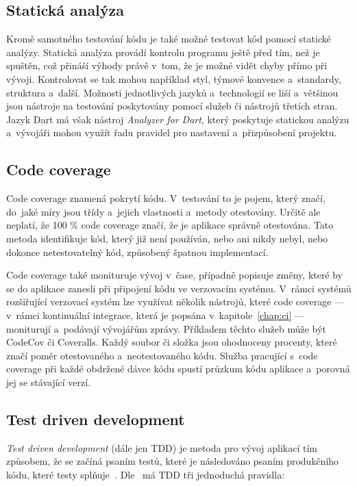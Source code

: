 \pagebreak
\subsection{Statická analýza}

Kromě samotného testování kódu je také možné testovat kód pomocí statické
analýzy.
Statická analýza provádí kontrolu programu ještě před tím,
než je spuštěn,
což přináší výhody právě v~tom,
že je možné vidět chyby přímo při vývoji.
Kontrolovat se tak mohou například styl, týmové konvence a~standardy, struktura
a~další.
Možnosti jednotlivých jazyků a~technologií se liší a~většinou jsou nástroje
na testování poskytovány pomocí služeb či nástrojů třetích stran.
Jazyk Dart má však nástroj \emph{Analyzer for Dart},
který poskytuje statickou analýzu
a~vývojáři mohou využít řadu pravidel pro nastavení
a~přizpůsobení projektu.~\cite{analyzer}

\subsection{Code coverage}

Code coverage znamená pokrytí kódu.
V~testování to je pojem,
který značí,
do~jaké míry jsou třídy a~jejich vlastnosti a~metody otestovány.
Určitě ale neplatí,
že 100 \% code coverage značí,
že je aplikace správně otestována.
Tato metoda identifikuje kód,
který již není používán,
nebo ani nikdy nebyl,
nebo dokonce netestovatelný kód,
způsobený špatnou implementací.~\cite{code_coverage}

Code coverage také monituruje vývoj v~čase,
případně popisuje změny,
které by se do aplikace zanesli při připojení kódu ve verzovacím systému.
V~rámci systémů rozšiřující verzovací systém lze využívat několik nástrojů,
které code coverage
--- v~rámci kontinuální integrace, která je popsána v~kapitole~\ref{chap:ci} ---
moniturují a~podávají vývojářům zprávy.
Příkladem těchto služeb může být CodeCov či Coveralls.
Každý soubor či složka jsou ohodnoceny procenty,
které značí poměr otestovaného a~neotestovaného kódu.
Služba pracující s~code coverage při každé obdržené dávce kódu spustí
průzkum kódu aplikace a~porovná jej se stávající verzí.~\cite{code_coverage}

\subsection{Test driven development}
\label{sec:tdd}

\emph{Test driven development} (dále jen TDD) je metoda pro vývoj aplikací tím
způsobem,
že se začíná psaním testů,
které je následováno psaním produkčního kódu,
které testy splňuje~\cite{tdd}.
Dle~\cite{tdd} má TDD tři jednoduchá pravidla:

